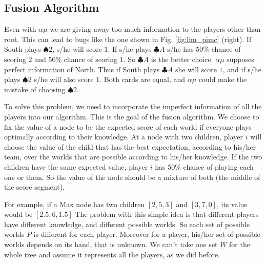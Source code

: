 \documentclass[runningheads]{llncs}
\begin{document}
\subsection{Fusion Algorithm}

Even with $\alpha\mu$ we are giving away too much information to the players other than root. This can lead to bugs like the one shown in Fig. \ref{fig:lim_pimc} (right).
If South plays $\spadesuit 2$, s/he will score $1$. If s/he plays $\clubsuit A$ s/he has $50\%$ chance of scoring $2$ and $50\%$ chance of scoring $1$. So $\clubsuit A$ is the better choice. $\alpha\mu$ supposes perfect information of North. Thus if South plays $\clubsuit A$ she will score $1$, and if s/he plays $\spadesuit 2$ s/he will also score $1$. Both cards are equal, and $\alpha\mu$ could make the mistake of choosing $\spadesuit 2$. 

To solve this problem, we need to incorporate the imperfect information of all the players into our algorithm. This is the goal of the fusion algorithm.
We choose to fix the value of a node to be the expected score of each world if everyone plays optimally according to their knowledge. At a node with two children, player $i$ will choose the value of the child that has the best expectation, according to his/her team, over the worlds that are possible according to his/her knowledge. If the two children have the same expected value, player $i$ has $50\%$ chance of playing each one or them. So the value of the node should be a mixture of both (the middle of the score segment). 

For example, if a Max node has two children $[2,5,3]$ and $[3,7,0]$, its value would be $[2.5,6,1.5]$
The problem with this simple idea is that different players have different knowledge, and different possible worlds. So each set of possible worlds $P$ is different for each player. Moreover for a player, his/her set of possible worlds depends on its hand, that is unknown. We can't take one set $W$ for the whole tree and assume it represents all the players, as we did before. 
\end{document}
